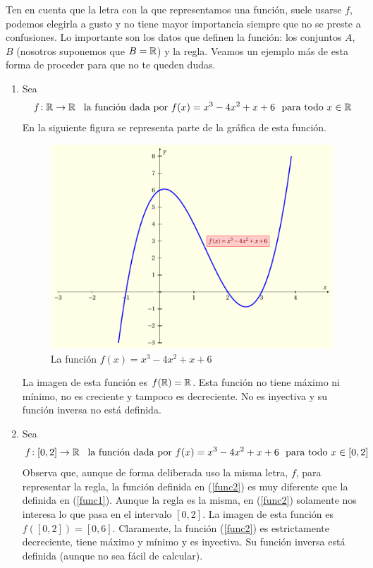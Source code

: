 Ten en cuenta que la letra con la que representamos una función, suele
usarse $f$, podemos elegirla a gusto y no tiene mayor importancia
siempre que no se preste a confusiones. Lo importante son los datos
que definen la función: los conjuntos $A$, $B$ (nosotros suponemos
que $B=\mathbb R$) y la regla. Veamos un ejemplo más de esta forma de proceder
para que no te queden dudas. 
\begin{enumerate}
\item Sea 
\begin{equation}
\funcreal{f}{\R}\ \textrm{\ la función dada por\ }f(x)=x^{3}-4x^{2}+x+6\ \textrm{\ para todo\ }x\in\R\label{func1}
\end{equation}
En la siguiente figura se representa parte de la gráfica de esta función.

\begin{figure}[ht]
\centering \includegraphics[scale=0.5]{17_home_antalcides_Calculo_pdf_image6-1.pdf}\caption{La función $f(x)=x^{3}-4x^{2}+x+6$}
\end{figure}

La imagen de esta función es $f(\mathbb R)=\mathbb R$. Esta función no tiene máximo
ni mínimo, no es creciente y tampoco es decreciente. No es inyectiva
y su función inversa no está definida.
\item Sea 
\begin{equation}
\funcreal{f}{[0,2]}\ \textrm{\ la función dada por\ }f(x)=x^{3}-4x^{2}+x+6\ \textrm{\ para todo\ }x\in[0,2]\label{func2}
\end{equation}
Observa que, aunque de forma deliberada uso la misma letra, $f$,
para representar la regla, la función definida en (\ref{func2}) es
muy diferente que la definida en (\ref{func1}). Aunque la regla es
la misma, en (\ref{func2}) solamente nos interesa lo que pasa en
el intervalo $[0,2]$. La imagen de esta función es $f([0,2])=[0,6]$.
Claramente, la función (\ref{func2}) es estrictamente decreciente,
tiene máximo y mínimo y es inyectiva. Su función inversa está definida
(aunque no sea fácil de calcular). 
\end{enumerate}

